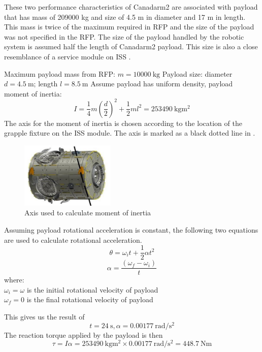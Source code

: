 These two performance characteristics of Canadarm2 are associated with payload that has mass of 209000 \gls{kg} and size of 4.5 \gls{m} in diameter and 17 \gls{m} in length. This mass is twice of the maximum required in \gls{RFP} and the size of the payload was not specified in the \gls{RFP}. The size of the payload handled by the robotic system is assumed half the length of Canadarm2 payload. This size is also a close resemblance of a service module on \gls{ISS} \cite{ISS_Harmony}.

Maximum payload mass from \gls{RFP}: $m=\SI{10000}{\kilo\gram}$
Payload size: diameter $d=\SI{4.5}{\metre}$; length $l=\SI{8.5}{\metre}$
Assume payload has uniform density, payload moment of inertia:
$$I=\frac{1}{4}m(\frac{d}{2})^2+\frac{1}{2}ml^2=\SI{253490}{\kilo\gram\square\metre}$$
The axis for the moment of inertia is chosen according to the location of the grapple fixture on the \gls{ISS} module\cite{ISS_Harmony}. The axis is marked as a black dotted line in .

\begin{figure}[H]
\centering
\includegraphics[width=0.4\textwidth]{Apppic/harmony}
\caption{Axis used to calculate moment of inertia}
\label{fig:harmony_axis}
\end{figure}

Assuming payload rotational acceleration is constant, the following two equations are used to calculate rotational acceleration.
\begin{equation}
\theta=\omega_it+\frac{1}{2}\alpha t^2
\end{equation}
\begin{equation}
\alpha=\frac{(\omega_f-\omega_i)}{t}
\end{equation}
where:\\
$\omega_i=\omega$ is the initial rotational velocity of payload\\
$\omega_f=0$ is the final rotational velocity of payload

This gives us the result of $$t=\SI{24}{\second}, \alpha=\SI{0.00177}{\radian/\square\second}$$
The reaction torque applied by the payload is then
$$\tau=I\alpha=\SI{253490}{\kilo\gram\square\metre}\times \SI{0.00177}{\radian/\square\second}=\SI{448.7}{\newton\metre}$$

